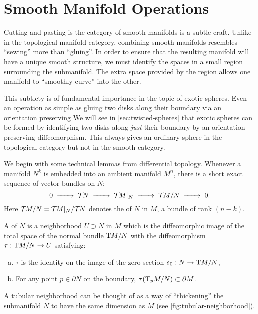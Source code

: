 \pagebreak
\section{Smooth Manifold Operations}\label{sec:smooth-manifold-operations}

Cutting and pasting is the category of smooth manifolds is a subtle craft. 
Unlike in the topological manifold category, combining smooth manifolds resembles ``sewing'' more than ``gluing''. In order to ensure that the resulting manifold will have a unique smooth structure, we must identify the spaces in a small region surrounding the submanifold. The extra space provided by the region allows one manifold to ``smoothly curve'' into the other.

\begin{remark*} 
	This subtlety is of fundamental importance in the topic of exotic spheres. Even an operation as simple as gluing two disks along their boundary via an orientation preserving 
	We will see in \cref{sec:twisted-spheres} that exotic spheres can be formed by identifying two disks along \emph{just} their boundary by an orientation preserving diffeomorphism. This always gives an ordinary sphere in the topological category but not in the smooth category.
\end{remark*}

We begin with some technical lemmas from differential topology. Whenever a manifold $N^k$ is embedded into an ambient manifold $M^n$, there is a short exact sequence of vector bundles on $N$:
\begin{equation}
	0 \lkxto \TT N\lkxto \TT M|_N \lkxto \TT M/N \lkxto 0.
\end{equation}
Here ${\mathcal{T}\hspace{-0.1em}} M/N={\mathcal{T}\hspace{-0.1em}} M|_N / {\mathcal{T}\hspace{-0.1em}} N$ denotes the  of $N$ in $M$, a bundle of rank $(n-k)$.

A  of $N$ is a neighborhood $U\supset N$ in $M$ which is the diffeomorphic image of the total space of the normal bundle $\mathrm{T} M/N$ with the diffeomorphism $\tau : \mathrm{T} M/N \to U$ satisfying:
\begin{enumerate}[(a)]
	\item $\tau$ is the identity on the image of the zero section $s_0 : N \to \mathrm{T} M/N$,
	\item For any point $p\in \partial N$ on the boundary, $\tau(\mathrm{T}_p M/N)\subset \partial M$.
\end{enumerate}

A tubular neighborhood can be thought of as a way of ``thickening'' the submanifold $N$ to have the same dimension as $M$ (see \cref{fig:tubular-neighborhood}). 

